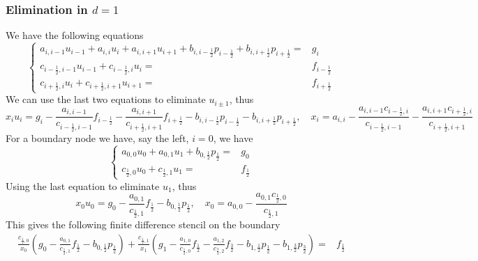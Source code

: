 \documentclass[12pt, english]{article}
\begin{document}
%
\subsubsection{Elimination in $d=1$}
%
We have the following equations
%
\begin{equation}\label{eq:}
%
\left\{
\begin{aligned}
a_{i,i-1} u_{i-1} + a_{i,i} u_{i} + a_{i,i+1} u_{i+1} + b_{i,i-\frac12} p_{i-\frac12}   + b_{i,i+\frac12} p_{i+\frac12} =& g_i\\
c_{i-\frac12, i-1} u_{i-1} + c_{i-\frac12, i} u_{i} =& f_{i-\frac12}\\
c_{i+\frac12, i} u_{i} + c_{i+\frac12, i+1} u_{i+1} =& f_{i+\frac12}
\end{aligned}
\right.
%
\end{equation}
%
We can use the last two equations to eliminate $u_{i\pm1}$, thus
%
\begin{equation}\label{eq:}
x_i u_i =  g_i - \frac{a_{i,i-1}}{c_{i-\frac12, i-1}}f_{i-\frac12}- \frac{a_{i,i+1}}{c_{i+\frac12, i+1}}f_{i+\frac12}
- b_{i,i-\frac12} p_{i-\frac12}   - b_{i,i+\frac12} p_{i+\frac12},\quad
x_i = a_{i,i} - \frac{a_{i,i-1}c_{i-\frac12, i}}{c_{i-\frac12, i-1}}- \frac{a_{i,i+1}c_{i+\frac12, i}}{c_{i+\frac12, i+1}}
\end{equation}
%
For a boundary node we have, say the left, $i=0$, we have
\begin{equation}\label{eq:}
%
\left\{
\begin{aligned}
a_{0,0} u_{0} + a_{0,1} u_{1} + b_{0,\frac12} p_{\frac12} =& g_0\\
c_{\frac12, 0} u_{0} + c_{\frac12, 1} u_{1} =& f_{\frac12}
\end{aligned}
\right.
%
\end{equation}
%
Using the last  equation to eliminate $u_{1}$, thus
%
\begin{equation}\label{eq:}
x_0 u_0 =  g_0 - \frac{a_{0,1}}{c_{\frac12, 1}}f_{\frac12}
  - b_{0,\frac12} p_{\frac12},\quad
x_0 = a_{0,0} -  \frac{a_{0,1}c_{\frac12, 0}}{c_{\frac12, 1}}
\end{equation}
%
This gives the following finite difference stencil on the boundary
%
%
\begin{align*}
\frac{c_{\frac12, 0}}{x_{0}} \left(g_0 - \frac{a_{0,1}}{c_{\frac12, 1}}f_{\frac12}
  - b_{0,\frac12} p_{\frac12}\right) 
  + \frac{c_{\frac12, 1}}{x_1} \left(
  g_1 - \frac{a_{1,0}}{c_{\frac12, 0}}f_{\frac12}- \frac{a_{1,2}}{c_{\frac32, 2}}f_{\frac32}
- b_{1,\frac12} p_{\frac12}   - b_{1,\frac32} p_{\frac32}
\right) =& f_{\frac12}
\end{align*}
\end{document}
